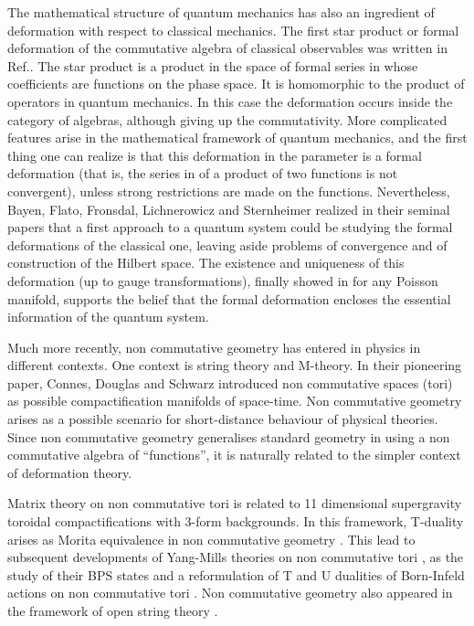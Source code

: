 \documentclass[a4paper,12pt]{article}
\begin{document}
The mathematical structure of quantum mechanics has also an ingredient of 
deformation with respect to classical mechanics. The first star product
or formal deformation of the commutative algebra of classical observables
was written in 
Ref.\cite{m}. The star product is a product in the space of formal series
in \myHighlight{$\hbar$}\coordHE{}         
whose coefficients are   functions on the  phase space. It  is homomorphic
to the product of 
operators in quantum mechanics. In this case the deformation occurs inside 
 the category of algebras, although giving up the commutativity. 
 More complicated features arise in the mathematical framework of quantum
mechanics, and 
the first thing one can realize is that this deformation in the parameter
\myHighlight{$\hbar$}\coordHE{} is a formal
 deformation (that is, the series in \myHighlight{$\hbar$}\coordHE{} of a product of two functions
is not convergent),
unless strong restrictions are made on the  functions. Nevertheless, 
Bayen, Flato, Fronsdal, Lichnerowicz and Sternheimer realized in their
seminal papers \cite{bffls}
that a first approach to a quantum system could be studying  the formal
deformations of 
the classical one, leaving aside problems of convergence and of
construction of the Hilbert space.
The existence and  uniqueness of this deformation (up to gauge
transformations), finally showed in
\cite{ko} for any Poisson manifold,  supports the belief that the formal
deformation encloses 
the essential information of the quantum system. 
 
Much more recently, non commutative geometry has entered in physics in
different 
contexts. One context is string theory and M-theory. In their pioneering
paper, Connes, Douglas 
and Schwarz \cite{cds} introduced non commutative spaces  (tori) as
possible 
compactification manifolds of space-time. Non commutative geometry  arises
as a possible
scenario for short-distance behaviour of physical theories. Since non
commutative 
geometry generalises standard geometry in using a non commutative algebra
of 
``functions'', it is naturally related to the simpler context of
deformation theory.

Matrix theory \cite{bfss, ikkt}
 on non commutative tori is 
  related 
to 11 dimensional supergravity toroidal compactifications with 3-form
backgrounds.
In this framework, T-duality arises as Morita equivalence in non
commutative geometry
\cite{rs}. This lead to subsequent developments of Yang-Mills theories on
non commutative 
tori \cite{mz}, as the  study of their BPS states \cite{bm} and a
reformulation of T and U dualities
of Born-Infeld actions on non commutative tori \cite{hv}. Non commutative
geometry also appeared
in the framework of open string theory \cite{dh}.
\end{document}
